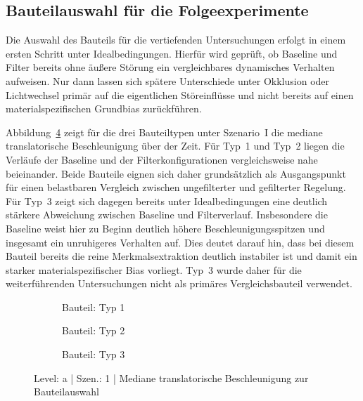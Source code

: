 \subsection{Bauteilauswahl für die Folgeexperimente}

Die Auswahl des Bauteils für die vertiefenden Untersuchungen erfolgt in einem ersten Schritt unter Idealbedingungen. Hierfür wird geprüft, ob Baseline und Filter bereits ohne äußere Störung ein vergleichbares dynamisches Verhalten aufweisen. Nur dann lassen sich spätere Unterschiede unter Okklusion oder Lichtwechsel primär auf die eigentlichen Störeinflüsse und nicht bereits auf einen materialspezifischen Grundbias zurückführen.

Abbildung~\ref{fig:a_1_bauteilauswahl_lin_acc} zeigt für die drei Bauteiltypen unter Szenario~I die mediane translatorische Beschleunigung über der Zeit. Für Typ~1 und Typ~2 liegen die Verläufe der Baseline und der Filterkonfigurationen vergleichsweise nahe beieinander. Beide Bauteile eignen sich daher grundsätzlich als Ausgangspunkt für einen belastbaren Vergleich zwischen ungefilterter und gefilterter Regelung. Für Typ~3 zeigt sich dagegen bereits unter Idealbedingungen eine deutlich stärkere Abweichung zwischen Baseline und Filterverlauf. Insbesondere die Baseline weist hier zu Beginn deutlich höhere Beschleunigungsspitzen und insgesamt ein unruhigeres Verhalten auf. Dies deutet darauf hin, dass bei diesem Bauteil bereits die reine Merkmalsextraktion deutlich instabiler ist und damit ein starker materialspezifischer Bias vorliegt. Typ~3 wurde daher für die weiterführenden Untersuchungen nicht als primäres Vergleichsbauteil verwendet.

\begin{figure}[htbp]
    \centering
    \begin{subfigure}[b]{0.49\textwidth}
        \caption{Bauteil: Typ 1}
        \label{fig:a_1_Typ1_timeseries_median_ibvs_lin_acc_l2}
    \end{subfigure}
    \hfill
    \begin{subfigure}[b]{0.49\textwidth}
        \caption{Bauteil: Typ 2}
        \label{fig:a_1_Typ2_timeseries_median_ibvs_lin_acc_l2}
    \end{subfigure}
    \vfill
    \begin{subfigure}[b]{0.49\textwidth}
        \caption{Bauteil: Typ 3}
        \label{fig:a_1_Typ3_timeseries_median_ibvs_lin_acc_l2}
    \end{subfigure}
    \caption{Level: a | Szen.: 1 | Mediane translatorische Beschleunigung zur Bauteilauswahl}
    \label{fig:a_1_bauteilauswahl_lin_acc}
\end{figure}

